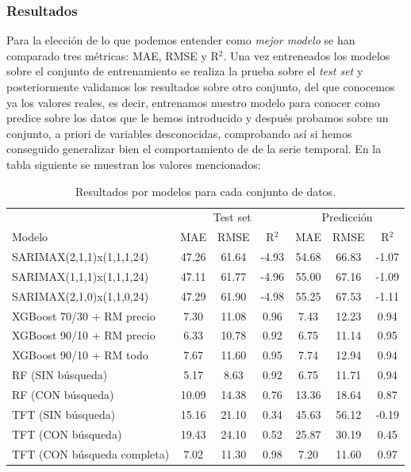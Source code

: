 \subsubsection{Resultados}
%
%
%
Para la elección de lo que podemos entender como \textit{mejor modelo} se han comparado tres métricas: MAE, RMSE y R$^2$. Una vez entreneados los modelos sobre el conjunto de entrenamiento se realiza la prueba sobre el \textit{test set} y posteriormente validamos los resultados sobre otro conjunto, del que conocemos ya los valores reales, es decir, entrenamos nuestro modelo para conocer como predice sobre los datos que le hemos introducido y después probamos sobre un conjunto, a priori de variables desconocidas, comprobando así si hemos conseguido generalizar bien el comportamiento de de la serie temporal. En la tabla siguiente se muestran los valores mencionados:
\begin{table}[H]
    \centering
    \begin{tabular}{l|ccc|ccc}
        & \multicolumn{3}{c}{Test set} & \multicolumn{3}{c}{Predicción} \\
        Modelo & MAE & RMSE & R$^2$ & MAE & RMSE & R$^2$ \\
        \hline
        SARIMAX(2,1,1)x(1,1,1,24) & 47.26 & 61.64 & -4.93 & 54.68 & 66.83 & -1.07 \\
        SARIMAX(1,1,1)x(1,1,1,24) & 47.11 & 61.77 & -4.96 & 55.00 & 67.16 & -1.09 \\
        SARIMAX(2,1,0)x(1,1,0,24) & 47.29 & 61.90 & -4.98 & 55.25 & 67.53 & -1.11 \\
        XGBoost 70/30 + RM precio  & 7.30  & 11.08 & 0.96 & 7.43  & 12.23 & 0.94 \\
        XGBoost 90/10 + RM precio  & 6.33  & 10.78 & 0.92 & 6.75  & 11.14 & 0.95 \\
        XGBoost 90/10 + RM todo    & 7.67  & 11.60 & 0.95 & 7.74  & 12.94 & 0.94 \\
        RF (SIN búsqueda) & 5.17  & 8.63  & 0.92 & 6.75  & 11.71 & 0.94 \\
        RF (CON búsqueda) & 10.09 & 14.38 & 0.76 & 13.36 & 18.64 & 0.87 \\
        TFT (SIN búsqueda)& 15.16    & 21.10    & 0.34   & 45.63    & 56.12          & -0.19 \\
        TFT (CON búsqueda)&19.43    & 24.10    & 0.52   & 25.87    & 30.19          & 0.45   \\
        TFT (CON búsqueda completa)& 7.02  & 11.30 & 0.98 & 7.20  & 11.60 & 0.97 \\
    \end{tabular}
    \caption{Resultados por modelos para cada conjunto de datos.}
    \label{tab:resultados_modelos}
\end{table}

